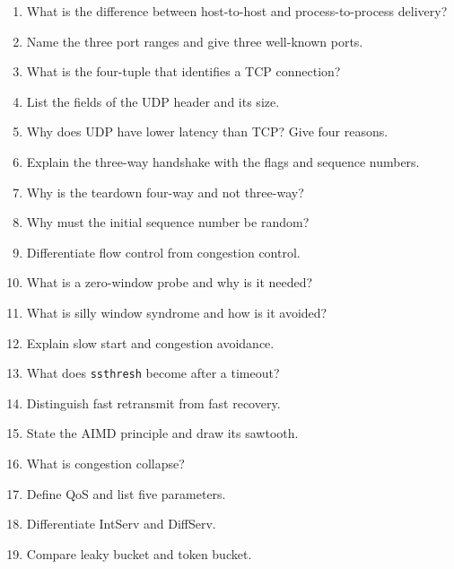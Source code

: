 \documentclass[11pt,a4paper]{article}
\begin{document}
\begin{enumerate}
\item What is the difference between host-to-host and process-to-process delivery?
\item Name the three port ranges and give three well-known ports.
\item What is the four-tuple that identifies a TCP connection?
\item List the fields of the UDP header and its size.
\item Why does UDP have lower latency than TCP? Give four reasons.
\item Explain the three-way handshake with the flags and sequence numbers.
\item Why is the teardown four-way and not three-way?
\item Why must the initial sequence number be random?
\item Differentiate flow control from congestion control.
\item What is a zero-window probe and why is it needed?
\item What is silly window syndrome and how is it avoided?
\item Explain slow start and congestion avoidance.
\item What does \texttt{ssthresh} become after a timeout?
\item Distinguish fast retransmit from fast recovery.
\item State the AIMD principle and draw its sawtooth.
\item What is congestion collapse?
\item Define QoS and list five parameters.
\item Differentiate IntServ and DiffServ.
\item Compare leaky bucket and token bucket.
\end{enumerate}
\end{document}
